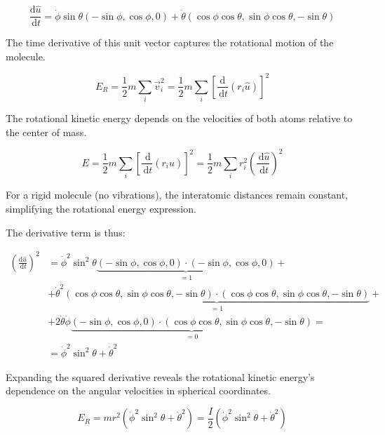 \documentclass[italian]{HKNdocument}
\begin{document}
\begin{equation}
\frac{\mathrm{d} \hat{u}}{\, \mathrm{d} t}=\dot{\phi} \sin \theta(-\sin \phi, \cos \phi, 0)+\dot{\theta}(\cos \phi \cos \theta, \sin \phi \cos \theta,-\sin \theta)
\end{equation}

The time derivative of this unit vector captures the rotational motion of the molecule.

\begin{equation}
E_{R}=\frac{1}{2} m \sum_{i} \vec{v}_{i}^{2}=\frac{1}{2} m \sum_{i}\left[\frac{\mathrm{d}}{\, \mathrm{d} t}\left(r_{i} \hat{u}\right)\right]^{2}
\end{equation}

The rotational kinetic energy depends on the velocities of both atoms relative to the center of mass.

\begin{equation}
E=\frac{1}{2} m \sum_{i}\left[\frac{\, \mathrm{d}}{\, \mathrm{d} t}\left(r_{i} \hat{u}\right)\right]^{2}=\frac{1}{2} m \sum_{i} r_{i}^{2}\left(\frac{\, \mathrm{d} \hat{u}}{\, \mathrm{d} t}\right)^{2}
\end{equation}

For a rigid molecule (no vibrations), the interatomic distances remain constant, simplifying the rotational energy expression.

The derivative term is thus:

\begin{align}
\left(\frac{\mathrm{d} \hat{u}}{\, \mathrm{d} t}\right)^{2} & =\dot{\phi}^{2} \sin ^{2} \theta \underbrace{(-\sin \phi, \cos \phi, 0) \cdot(-\sin \phi, \cos \phi, 0)}_{=1}+ \\
& +\dot{\theta}^{2} \underbrace{(\cos \phi \cos \theta, \sin \phi \cos \theta,-\sin \theta) \cdot(\cos \phi \cos \theta, \sin \phi \cos \theta,-\sin \theta)}_{=1}+ \\
& +2 \dot{\theta} \dot{\phi} \underbrace{(-\sin \phi, \cos \phi, 0) \cdot(\cos \phi \cos \theta, \sin \phi \cos \theta,-\sin \theta)}_{=0}= \\
& =\dot{\phi}^{2} \sin ^{2} \theta+\dot{\theta}^{2}
\end{align}

Expanding the squared derivative reveals the rotational kinetic energy's dependence on the angular velocities in spherical coordinates.

\begin{equation}
E_{R}=m r^{2}\left(\dot{\phi}^{2} \sin ^{2} \theta+\dot{\theta}^{2}\right)=\frac{I}{2}\left(\dot{\phi}^{2} \sin ^{2} \theta+\dot{\theta}^{2}\right)
\end{equation}
\end{document}

